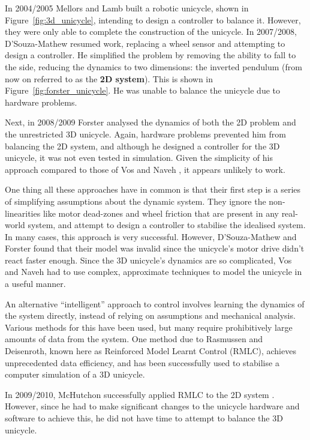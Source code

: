 \documentclass{IIBproject}
\begin{document}
In 2004/2005 Mellors and Lamb \cite{ref:mellors,ref:lamb} built a robotic
unicycle, shown in Figure~\ref{fig:3d_unicycle}, intending to design a controller to balance it. However, they were
only able to complete the construction of the unicycle. In 2007/2008,
D'Souza-Mathew resumed work, replacing a wheel sensor and attempting to design
a controller. He simplified the problem by removing the ability to fall to the
side, reducing the dynamics to two dimensions: the inverted pendulum (from
now on referred to as the \textbf{2D system}). This is shown in
Figure~\ref{fig:forster_unicycle}. He was unable to balance the unicycle due to
hardware problems.

Next, in 2008/2009 Forster analysed the dynamics of both the 2D problem and
the unrestricted 3D unicycle\cite{ref:forster}. Again, hardware problems
prevented him from balancing the 2D system, and although he designed a
controller for the 3D unicycle, it was not even tested in simulation. Given
the simplicity of his approach compared to those of Vos and Naveh
\cite{ref:vos,ref:naveh}, it appears unlikely to work.

One thing all these approaches have in common is that their first step is a
series of simplifying assumptions about the dynamic system. They ignore the
non-linearities like motor dead-zones and wheel friction that are present in
any real-world system, and attempt to design a controller to stabilise the
idealised system. In many cases, this approach is very successful. However,
D'Souza-Mathew and Forster found that their model was invalid since the
unicycle's motor drive didn't react faster enough. Since the 3D unicycle's
dynamics are so complicated, Vos and Naveh had to use
complex, approximate techniques to model the unicycle in a useful manner.

An alternative ``intelligent'' approach to control involves learning the
dynamics of the system directly, instead of relying on assumptions and
mechanical analysis. Various methods for this have been used, but many require
prohibitively large amounts of data from the system. One method due to
Rasmussen and Deisenroth, known here as Reinforced Model Learnt Control
(RMLC), achieves unprecedented data efficiency, and has been successfully used
to stabilise a computer simulation of a 3D
unicycle\cite{ref:rasdei08,ref:rasdei11}.

In 2009/2010, McHutchon successfully applied RMLC to the 2D system
\cite{ref:mchutchon}. However, since he had to make significant changes to the
unicycle hardware and software to achieve this, he did not have time to
attempt to balance the 3D unicycle.
\end{document}
